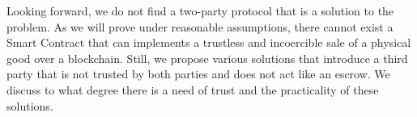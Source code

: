 \documentclass{cacthesis}
\newcommand{\authnote}[3]{{ \footnotesize \textbf{#1[#2: #3]~}}}
\newcommand{\niknote}[1]{\authnote{\color{red}}{Nikos}{#1}}
\begin{document}
Looking forward, we do not find a two-party protocol that is a solution to the problem. As we will prove under reasonable assumptions, there cannot exist a Smart Contract that can implements a trustless and incoercible sale of a physical good over a blockchain. Still, we propose various solutions that introduce a third party that is not trusted by both parties and does not act like an escrow. We discuss to what degree there is a need of trust and the practicality of these solutions.  \newline


	
	
\end{document}

